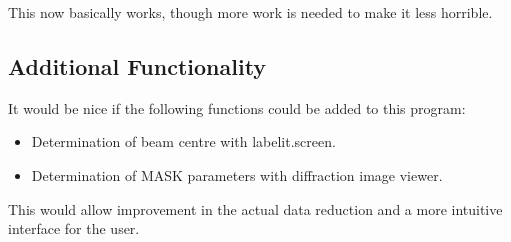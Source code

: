 \documentclass[a4paper, 11pt]{article}
\begin{document}
This now basically works, though more work is needed to make it less
horrible.

\subsection{Additional Functionality}

It would be nice if the following functions could be added to this program:

\begin{itemize}
\item{Determination of beam centre with labelit.screen.}
\item{Determination of MASK parameters with diffraction image viewer.}
\end{itemize}

This would allow improvement in the actual data reduction and a more intuitive
interface for the user.
\end{document}
